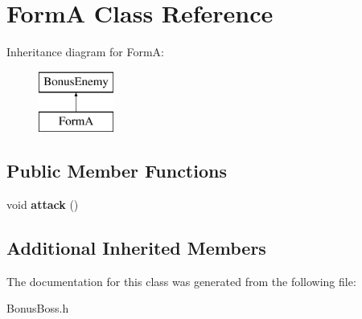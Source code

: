 \hypertarget{class_form_a}{\section{Form\+A Class Reference}
\label{class_form_a}
}
Inheritance diagram for Form\+A\+:\begin{figure}[H]
\begin{center}
\leavevmode
\includegraphics[height=2.000000cm]{class_form_a}
\end{center}
\end{figure}
\subsection*{Public Member Functions}
\begin{DoxyCompactItemize}
\item 
\hypertarget{class_form_a_aea7c6fc2a17ed6cf400878a2f53aeb96}{void {\bfseries attack} ()}\label{class_form_a_aea7c6fc2a17ed6cf400878a2f53aeb96}

\end{DoxyCompactItemize}
\subsection*{Additional Inherited Members}


The documentation for this class was generated from the following file\+:\begin{DoxyCompactItemize}
\item 
Bonus\+Boss.\+h\end{DoxyCompactItemize}

